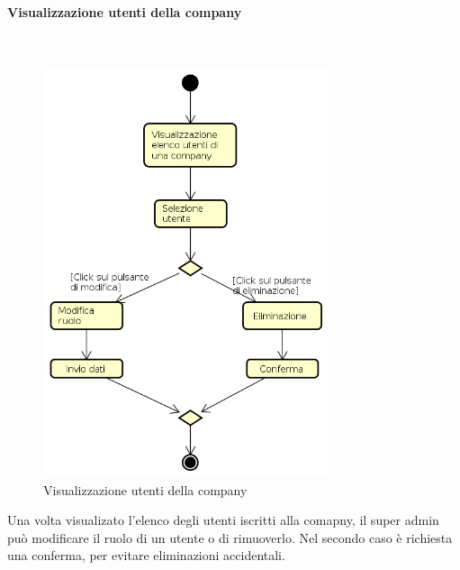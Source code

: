 \paragraph{Visualizzazione utenti della company} \mbox{} \\
\begin{figure}[H]
\begin{center}
\includegraphics[height=12cm]{res/sections/backend/activities/operazioniUtentiSA.png}
\caption{Visualizzazione utenti della company}
\end{center}
\end{figure}
Una volta visualizato l'elenco degli utenti iscritti alla comapny, il super admin può modificare il ruolo di un utente o di rimuoverlo. Nel secondo caso è richiesta una conferma, per evitare eliminazioni accidentali.
